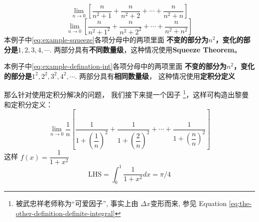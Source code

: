 \begin{example}
    \begin{equation} \label{eq:example-squeeze}
        \lim_{n \to 0} \left[ 
        \dfrac{n}{n^2+1} + \dfrac{n}{n^2+2} + \cdots + \dfrac{n}{n^2+n} 
        \right]  
    \end{equation}
    \begin{equation} \label{eq:example-defination-int}
        \lim_{n \to 0} \left[ 
        \dfrac{n}{n^2+1^2} + \dfrac{n}{n^2+2^2} + \cdots + \dfrac{n}{n^2+n^2} 
        \right]  
    \end{equation}
    本例子中\ref{eq:example-squeeze}各项分母中的两项里面
    \textbf{不变的部分为$n^2$，变化的部分是$1,2,3,4,\cdots$}.
    两部分具有\textbf{不同数量级}，这种情况使用\textbf{Squeeze Theorem}。

    本例子中\ref{eq:example-defination-int}各项分母中的两项里面
    \textbf{不变的部分为$n^2$，变化的部分是$1^2,2^2,3^2,4^2,\cdots$}.
    两部分具有\textbf{相同数量级}，
    这种情况使用\textbf{定积分定义}

    那么针对使用定积分解决的问题，
    我们接下来提一个因子
    \footnote{
        被武忠祥老师称为“可爱因子”, 事实上由 
        $\Delta x$变形而来, 
        参见 Equation \ref{eq:the-other-definition-definite-integral}
    }，这样可构造出黎曼和定积分定义：
    \begin{equation*}
        \lim_{n \to 0} \dfrac{1}{n} \left[ 
        \dfrac{1}{1+\left(\dfrac{1}{n}\right)^2} + 
        \dfrac{1}{1+\left(\dfrac{2}{n}\right)^2} + \cdots + 
        \dfrac{1}{1+\left(\dfrac{n}{n}\right)^2}
        \right]  
    \end{equation*}
    这样 $f(x) = \dfrac{1}{1+x^2}$
    \begin{equation*}
        \mbox{LHS} = \int_{0}^{1} \dfrac{1}{1+x^2} dx = \pi / 4
    \end{equation*}
\end{example}

